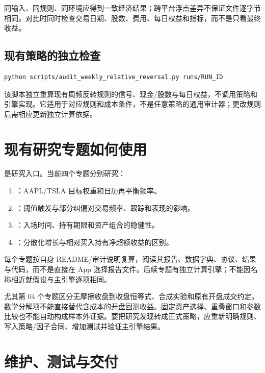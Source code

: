 \documentclass[UTF8,fontset=none,11pt]{ctexart}
\newcommand{\chapterpage}{\par}
\let\originalsection\section
\renewcommand{\section}{\Needspace{9\baselineskip}\originalsection}
\let\originalsubsection\subsection
\renewcommand{\subsection}{\Needspace{8\baselineskip}\originalsubsection}
\begin{document}
同输入、同规则、同环境应得到一致经济结果；跨平台浮点差异不保证文件逐字节相同。对比时同时检查交易日期、股数、费用、每日权益和指标，而不是只看最终收益。

\subsection{现有策略的独立检查}
\begin{lstlisting}[language=bash]
python scripts/audit_weekly_relative_reversal.py runs/RUN_ID
\end{lstlisting}
该脚本独立重算现有周频反转规则的信号、现金/股数与每日权益，不调用策略和引擎实现。它适用于对应规则和成本条件，不是任意策略的通用审计器；更改规则后需相应更新独立计算依据。

\section{现有研究专题如何使用}
 是研究入口。当前四个专题分别研究：
\begin{enumerate}
\item {}：AAPL/TSLA 目标权重和日历再平衡频率。
\item {}：阈值触发与部分纠偏对交易频率、跟踪和表现的影响。
\item {}：入场时间、持有期限和资产组合的稳健性。
\item {}：分散化增长与相对买入持有净超额收益的区别。
\end{enumerate}
每个专题按自身 README/审计说明复算，阅读其报告、数据字典、协议、结果与代码，而不是直接在 App 选择报告文件。后续专题有独立计算引擎；不能因名称相近就假设与主引擎逐项相同。

尤其第 04 个专题区分无摩擦收盘到收盘恒等式、合成实验和原有开盘成交约定。数学分解项不能直接替代含成本的开盘回测收益。固定资产选择、重叠窗口和参数比较也不能自动构成样本外证据。要把研究发现转成正式策略，应重新明确规则、写入策略/因子合同、增加测试并验证主引擎结果。

\chapterpage
\section{维护、测试与交付}
\end{document}
